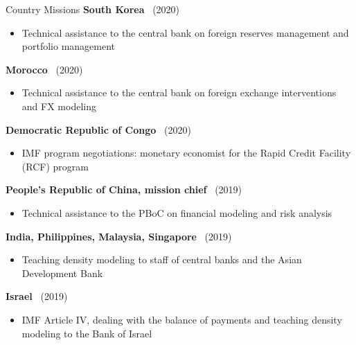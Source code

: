 \documentclass[usegeometry, 10pt, a4paper]{cv} %
\newcommand{\activite}[1]{\textbf{#1}\ }
\newcommand{\midreduce}{-0.5cm}
\begin{document}
\begin{rubriquetableau}[0.95\textwidth]{Country Missions}
  \activite{South Korea} (2020)\\
  \vspace{\midreduce}
  \begin{itemize}[label={}]
    \item \small{Technical assistance to the central bank on foreign reserves
        management and portfolio management}
  \end{itemize}

  \activite{Morocco} (2020)\\
  \vspace{\midreduce}
  \begin{itemize}[label={}]
    \item \small{Technical assistance to the central bank on foreign exchange
        interventions and FX modeling}
  \end{itemize}

  \activite{Democratic Republic of Congo} (2020)\\
  \vspace{\midreduce}
  \begin{itemize}[label={}]
    \item \small{IMF program negotiations: monetary economist for the Rapid
        Credit Facility (RCF) program}
  \end{itemize}

  \activite{People's Republic of China, mission chief} (2019)\\
  \vspace{\midreduce}
  \begin{itemize}[label={}]
    \item \small{Technical assistance to the PBoC on financial modeling and
        risk analysis}
  \end{itemize}
  
  \activite{India, Philippines, Malaysia, Singapore} (2019)\\
  \vspace{\midreduce}
  \begin{itemize}[label={}]
    \item \small{Teaching density modeling to staff of central banks and the Asian Development Bank}
  \end{itemize}

  \activite{Israel} (2019)\\
  \vspace{\midreduce}
  \begin{itemize}[label={}]
    \item \small{IMF Article IV, dealing with the balance of payments and teaching density modeling to the Bank of Israel}
  \end{itemize}


\end{rubriquetableau}
\end{document}
